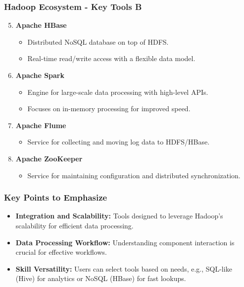 \documentclass{beamer}
\begin{document}
\begin{frame}[fragile]
    \frametitle{Hadoop Ecosystem - Key Tools B}
    \begin{enumerate}
        \setcounter{enumi}{4}
        \item \textbf{Apache HBase}
            \begin{itemize}
                \item Distributed NoSQL database on top of HDFS.
                \item Real-time read/write access with a flexible data model.
            \end{itemize}
        \item \textbf{Apache Spark}
            \begin{itemize}
                \item Engine for large-scale data processing with high-level APIs.
                \item Focuses on in-memory processing for improved speed.
            \end{itemize}
        \item \textbf{Apache Flume}
            \begin{itemize}
                \item Service for collecting and moving log data to HDFS/HBase.
            \end{itemize}
        \item \textbf{Apache ZooKeeper}
            \begin{itemize}
                \item Service for maintaining configuration and distributed synchronization.
            \end{itemize}
    \end{enumerate}
\end{frame}

\begin{frame}
    \frametitle{Key Points to Emphasize}
    \begin{itemize}
        \item \textbf{Integration and Scalability:} Tools designed to leverage Hadoop's scalability for efficient data processing.
        \item \textbf{Data Processing Workflow:} Understanding component interaction is crucial for effective workflows.
        \item \textbf{Skill Versatility:} Users can select tools based on needs, e.g., SQL-like (Hive) for analytics or NoSQL (HBase) for fast lookups.
    \end{itemize}
\end{frame}
\end{document}
